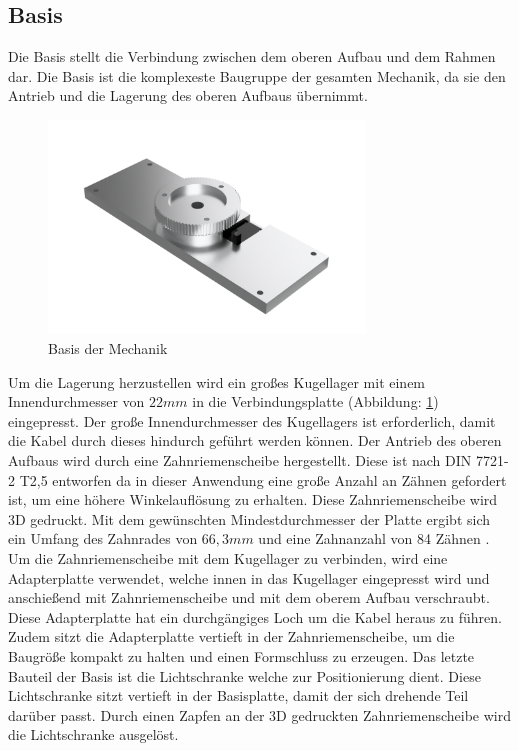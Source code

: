 \subsection{Basis}
Die Basis stellt die Verbindung zwischen dem oberen Aufbau und dem Rahmen dar. Die Basis ist die komplexeste Baugruppe der gesamten Mechanik, da sie den Antrieb und die Lagerung des oberen Aufbaus übernimmt. 
\begin{figure}[H]
	\centering
	\includegraphics[width=0.75\textwidth]{images/Mechanik/Basis}
	\caption{Basis der Mechanik}
	\label{basis}
\end{figure}
Um die Lagerung herzustellen wird ein großes Kugellager mit einem Innendurchmesser von $22mm$ in die Verbindungsplatte (Abbildung: \ref{basis}) eingepresst. Der große Innendurchmesser des Kugellagers ist erforderlich, damit die Kabel durch dieses hindurch geführt werden können. Der Antrieb des oberen Aufbaus wird durch eine Zahnriemenscheibe hergestellt. Diese ist nach DIN 7721-2 T2,5 \cite{Tabellenbuch} entworfen da in dieser Anwendung eine große Anzahl an Zähnen gefordert ist, um eine höhere Winkelauflösung zu erhalten. Diese Zahnriemenscheibe wird 3D gedruckt. Mit dem gewünschten Mindestdurchmesser der Platte ergibt sich ein Umfang des Zahnrades von $66,3mm$ und eine Zahnanzahl von 84 Zähnen \cite{Tabellenbuch}. Um die Zahnriemenscheibe mit dem Kugellager zu verbinden, wird eine Adapterplatte verwendet, welche innen in das Kugellager eingepresst wird und anschießend mit Zahnriemenscheibe und mit dem oberem Aufbau verschraubt. Diese Adapterplatte hat ein durchgängiges Loch um die Kabel heraus zu führen. Zudem sitzt die Adapterplatte vertieft in der Zahnriemenscheibe, um die Baugröße kompakt zu halten und einen Formschluss zu erzeugen. Das letzte Bauteil der Basis ist die Lichtschranke welche zur Positionierung dient. Diese Lichtschranke sitzt vertieft in der Basisplatte, damit der sich drehende Teil darüber passt. Durch einen Zapfen an der 3D gedruckten Zahnriemenscheibe wird die Lichtschranke ausgelöst. 
